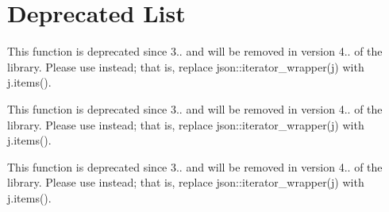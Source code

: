 \chapter{Deprecated List}
\hypertarget{deprecated}{}\label{deprecated}

\begin{DoxyRefList}
\item[Member \doxylink{classbasic__json_ab8b4e0acdea49e5f0a77abdf1ce465d2}{basic\+\_\+json\texorpdfstring{$<$}{<} Object\+Type, Array\+Type, String\+Type, Boolean\+Type, Number\+Integer\+Type, Number\+Unsigned\+Type, Number\+Float\+Type, Allocator\+Type, JSONSerializer, Binary\+Type, Custom\+Base\+Class \texorpdfstring{$>$}{>}\+::iterator\+\_\+wrapper} (reference ref) noexcept]\label{deprecated__deprecated000001}%
%
This function is deprecated since 3.. and will be removed in version 4.. of the library. Please use  instead; that is, replace {\ttfamily json\+::iterator\+\_\+wrapper(j)} with {\ttfamily j.\+items()}.  
\item[Member \doxylink{classbasic__json_a7c0314258e5347eade0c6851017bf5a5}{basic\+\_\+json\texorpdfstring{$<$}{<} Object\+Type, Array\+Type, String\+Type, Boolean\+Type, Number\+Integer\+Type, Number\+Unsigned\+Type, Number\+Float\+Type, Allocator\+Type, JSONSerializer, Binary\+Type, Custom\+Base\+Class \texorpdfstring{$>$}{>}\+::iterator\+\_\+wrapper} (const\+\_\+reference ref) noexcept]\label{deprecated__deprecated000002}%
%
This function is deprecated since 3.. and will be removed in version 4.. of the library. Please use  instead; that is, replace {\ttfamily json\+::iterator\+\_\+wrapper(j)} with {\ttfamily j.\+items()}.  
\item[Member \doxylink{classbasic__json_ab8b4e0acdea49e5f0a77abdf1ce465d2}{basic\+\_\+json\texorpdfstring{$<$}{<} Object\+Type, Array\+Type, String\+Type, Boolean\+Type, Number\+Integer\+Type, Number\+Unsigned\+Type, Number\+Float\+Type, Allocator\+Type, JSONSerializer, Binary\+Type, Custom\+Base\+Class \texorpdfstring{$>$}{>}\+::iterator\+\_\+wrapper} (reference ref) noexcept]\label{deprecated__deprecated000005}%
%
This function is deprecated since 3.. and will be removed in version 4.. of the library. Please use  instead; that is, replace {\ttfamily json\+::iterator\+\_\+wrapper(j)} with {\ttfamily j.\+items()}.  

\end{DoxyRefList}

